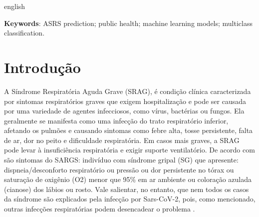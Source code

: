 \documentclass[12pt,oneside,a4paper,chapter=TITLE,
			   english,brazil]{abntex2}
\begin{document}
\begin{resumo}[Abstract]
\begin{otherlanguage*}{english}
        
        \textbf{Keywords}: ASRS prediction; public health; machine learning models; multiclass classification.
	\end{otherlanguage*}
\end{resumo}
\vspace{\onelineskip}


\listoffigures*
\cleardoublepage


\listoftables*
\cleardoublepage



\tableofcontents*
\cleardoublepage


\textual

\setcounter{page}{12}
\chapter{Introdução}
\label{introducao}

 A Síndrome Respiratória Aguda Grave (SRAG),   é  condição clínica caracterizada por sintomas respiratórios graves que exigem hospitalização e pode ser causada por uma variedade de agentes infecciosos, como vírus, bactérias ou fungos. Ela geralmente se manifesta como uma infecção do trato respiratório inferior, afetando os pulmões e causando sintomas como febre alta, tosse persistente, falta de ar, dor no peito e dificuldade respiratória. Em casos mais graves, a SRAG pode levar à insuficiência respiratória e exigir suporte ventilatório. De acordo com  são sintomas do SARGS: indivíduo com  síndrome gripal (SG) que apresente: dispneia/desconforto respiratório ou pressão ou dor persistente no tórax ou saturação de  oxigênio (O2) menor que 95\% em ar ambiente ou coloração azulada (cianose) dos lábios ou rosto.  Vale salientar, no entanto, que nem todos os casos da síndrome são explicados pela infecção por Sars-CoV-2, pois, como mencionado, outras infecções respiratórias podem desencadear o problema \cite{brasilescola}.
\end{document}
